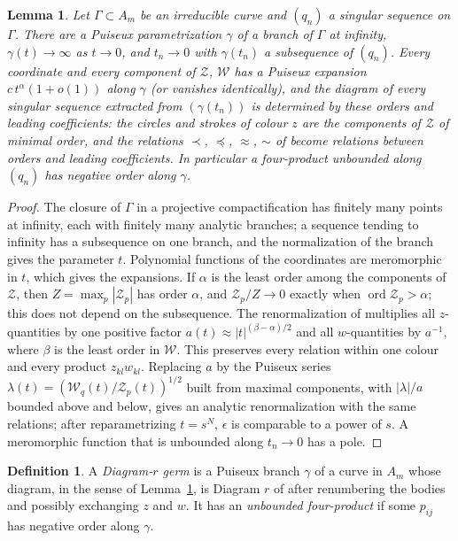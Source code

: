 \documentclass[11pt]{amsart}
\newtheorem{lemma}[theorem]{Lemma}
\theoremstyle{definition}
\newtheorem{definition}[theorem]{Definition}
\theoremstyle{remark}
\newcommand{\ord}{\operatorname{ord}}
\begin{document}
\begin{lemma}\label{lem:germ}
Let $\Gamma\subset A_m$ be an irreducible curve and $(q_n)$ a singular sequence on $\Gamma$.  There
are a Puiseux parametrization $\gamma$ of a branch of $\Gamma$ at infinity, $\gamma(t)\to\infty$ as
$t\to 0$, and $t_n\to0$ with $\gamma(t_n)$ a subsequence of $(q_n)$.  Every coordinate and every
component of $\mathcal Z$, $\mathcal W$ has a Puiseux expansion $c\,t^{\alpha}(1+o(1))$ along
$\gamma$ (or vanishes identically), and the diagram of every singular sequence extracted from
$(\gamma(t_n))$ is determined by these orders and leading coefficients: the circles and strokes
of colour $z$ are the components of $\mathcal Z$ of minimal order, and the relations $\prec$,
$\preccurlyeq$, $\approx$, $\sim$ of \cite[\S3]{AK} become relations between orders and leading
coefficients.  In particular a four-product unbounded along $(q_n)$ has negative order along
$\gamma$.
\end{lemma}

\begin{proof}
The closure of $\Gamma$ in a projective compactification has finitely many points at infinity,
each with finitely many analytic branches; a sequence tending to infinity has a subsequence on
one branch, and the normalization of the branch gives the parameter $t$.  Polynomial functions
of the coordinates are meromorphic in $t$, which gives the expansions.  If $\alpha$ is the least
order among the components of $\mathcal Z$, then $Z=\max_p|\mathcal Z_p|$ has order $\alpha$, and
$\mathcal Z_p/Z\to0$ exactly when $\ord\mathcal Z_p>\alpha$; this does not depend on the
subsequence.  The renormalization of \cite[p.~547]{AK} multiplies all $z$-quantities by one
positive factor $a(t)\approx|t|^{(\beta-\alpha)/2}$ and all $w$-quantities by $a^{-1}$, where
$\beta$ is the least order in $\mathcal W$.  This preserves every relation within one colour and
every product $z_{kl}w_{kl}$.  Replacing $a$ by the Puiseux series $\lambda(t)=(\mathcal W_q(t)/
\mathcal Z_p(t))^{1/2}$ built from maximal components, with $|\lambda|/a$ bounded above and
below, gives an analytic renormalization with the same relations; after reparametrizing
$t=s^N$, $\epsilon$ is comparable to a power of $s$.  A meromorphic function that is unbounded
along $t_n\to0$ has a pole.
\end{proof}

\begin{definition}\label{def:germ}
A \emph{Diagram-$r$ germ} is a Puiseux branch $\gamma$ of a curve in $A_m$ whose diagram, in the
sense of Lemma~\ref{lem:germ}, is Diagram $r$ of \cite[Fig.~11]{AK} after renumbering the bodies
and possibly exchanging $z$ and $w$.  It has an \emph{unbounded four-product} if some $p_{ij}$ has
negative order along $\gamma$.
\end{definition}
\end{document}
